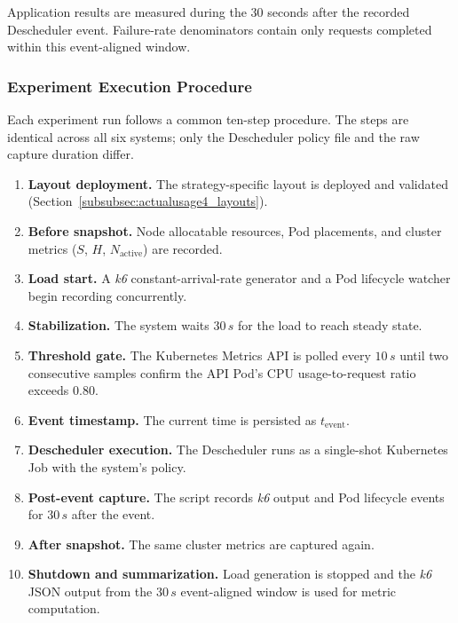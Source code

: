 Application results are measured during the \(30\) seconds after the recorded Descheduler event. Failure-rate denominators contain only requests completed within this event-aligned window.

\subsubsection{Experiment Execution Procedure}
\label{subsubsec:actualusage4_procedure}

Each experiment run follows a common ten-step procedure. The steps are identical across all six systems; only the Descheduler policy file and the raw capture duration differ.

\begin{enumerate}
    \item \textbf{Layout deployment.} The strategy-specific layout is deployed and validated (Section~\ref{subsubsec:actualusage4_layouts}).
    \item \textbf{Before snapshot.} Node allocatable resources, Pod placements, and cluster metrics (\(S\), \(H\), \(N_{\text{active}}\)) are recorded.
    \item \textbf{Load start.} A \textit{k6} constant-arrival-rate generator and a Pod lifecycle watcher begin recording concurrently.
    \item \textbf{Stabilization.} The system waits \(30\,s\) for the load to reach steady state.
    \item \textbf{Threshold gate.} The Kubernetes Metrics API is polled every \(10\,s\) until two consecutive samples confirm the API Pod's CPU usage-to-request ratio exceeds \(0.80\).
    \item \textbf{Event timestamp.} The current time is persisted as \(t_{\text{event}}\).
    \item \textbf{Descheduler execution.} The Descheduler runs as a single-shot Kubernetes Job with the system's policy.
    \item \textbf{Post-event capture.} The script records \textit{k6} output and Pod lifecycle events for \(30\,s\) after the event.
    \item \textbf{After snapshot.} The same cluster metrics are captured again.
    \item \textbf{Shutdown and summarization.} Load generation is stopped and the \textit{k6} JSON output from the \(30\,s\) event-aligned window is used for metric computation.
\end{enumerate}

